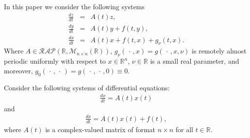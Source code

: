 \documentclass[english,reqno]{amsart}
\numberwithin{equation}{section}
\theoremstyle{plain}
\theoremstyle{definition}
\theoremstyle{remark}
\begin{document}
In this paper we consider the following systems
\begin{eqnarray}
\frac{dz}{dt} & = & A\left(t\right)z,\label{eq:lineal}\\
\frac{dy}{dt} & = & A\left(t\right)y+f\left(t,y\right),\label{eq:lineal_nohomo}\\
\frac{dx}{dt} & = & A\left(t\right)x+f\left(t,x\right)+g_{\nu}\left(t,x\right).\label{eq:perturbado}
\end{eqnarray}
Where $A \in\mathcal{RAP}\left(\mathbb{R},\mathcal{M}_{n\times n}(\mathbb{R})\right)$, $g_{\nu}\left(\,\cdot\,,x\right)=g\left(\,\cdot\,,x,\nu\right)$ is remotely almost periodic uniformly with respect to $x\in \mathbb{R}^n$, $\nu\in \mathbb{R}$  is a small real parameter, and moreover, $g_{0}(\,\cdot\,,\,\cdot\,)=g(\,\cdot\,,\,\cdot\,,0)\equiv 0$.


Consider the following systems of differential equations:
\begin{align}\label{(1.1)}
\frac{dx}{dt}=A(t)x(t)
\end{align}
and
\begin{align}\label{(1.2)}
\frac{dx}{dt}=A(t)x(t)+f(t),
\end{align}				
where $A(t)$ is a complex-valued matrix of format $n\times n$ for all $t\in {\mathbb R}.$ 	
\end{document}
